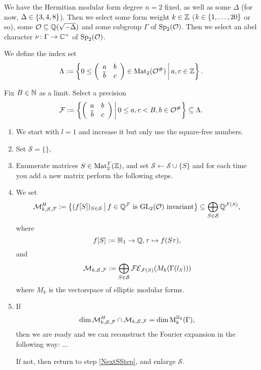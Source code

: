 \begin{algo}
We have the Hermitian modular form degree $n = 2$ fixed, as well as some $\Delta$ (for now, $\Delta \in \Set{3,4,8}$). Then we select some form weight $k \in \mathbb{Z}$ ($k \in \Set{1,\dots,20}$ or so), some $\mathcal{O} \subseteq \mathbb{Q}(\sqrt{-\Delta})$ and some subgroup $\Gamma$ of $\operatorname{Sp}_2(\mathcal{O})$. Then we select an abel character $\nu \colon \Gamma \rightarrow \mathbb{C}^\times$ of $\operatorname{Sp}_2(\mathcal{O})$.

We define the index set
\[ \Lambda := \Set{0 \le \SimpleMatrix{a}{b}{\overline b}{c} \in \M_2(\curlO^\#)}{a,c \in \Z } . \]

Fix $B \in \mathbb{N}$ as a limit. Select a precision
\[ \F := \Set{\SimpleMatrix{a}{b}{\overline b}{c}}{0 \le a , c < B, b \in \curlO^\#} \subseteq \Lambda . \]

\begin{enumerate}
\item We start with $l = 1$ and increase it but only use the square-free numbers.
\item Set $\mathcal{S} = \{\}$,
\item\label{NextSStep} Enumerate matrices $S \in \operatorname{Mat}_2^T(\mathbb{Z})$, and set $\mathcal{S} \leftarrow \mathcal{S} \cup \{ S \}$ and for each time you add a new matrix perform the following steps.


\item We set
\[ \mathcal{M}_{k,\mathcal{S},\F}^H := \Set{ (f [S])_{S\in\mathcal{S}} }{\text{$f \in \Q^\F$ is $\GL_2(\curlO)$ invariant}} \subseteq \bigoplus_{S\in\mathcal{S}} \Q^{\F(S)} , \]
where
\[ f[S] := \mathbb{H}_1 \rightarrow \mathbb{Q}, \tau \mapsto f(S \tau), \]
and
\[ \mathcal{M}_{k, \mathcal{S},\mathcal{F}} := \bigoplus_{S\in\mathcal{S}} \mathcal{FE}_{\mathcal{F}(S)}(M_k(\Gamma(l_S))) \]
where $M_k$ is the vectorspace of elliptic modular forms. %

\item
If
\[ \dim \mathcal{M}_{k,\mathcal{S},\mathcal{F}}^H \cap \mathcal{M}_{k, \mathcal{S},\mathcal{F}}
= \dim \operatorname{M}^{\mathbb{H}_{2}}_k (\Gamma) , \]
then we are ready and we can reconstruct the Fourier expansion in the following way: ...

If not, then return to step \ref{NextSStep}, and enlarge $\mathcal{S}$.
\end{enumerate}
\end{algo}

